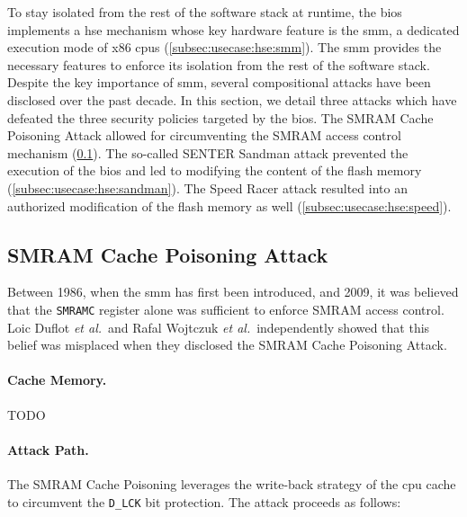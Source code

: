 To stay isolated from the rest of the software stack at runtime, the \ac{bios}
implements a \ac{hse} mechanism whose key hardware feature is the \ac{smm}, a
dedicated execution mode of x86 \acp{cpu} (\ref{subsec:usecase:hse:smm}).
%
The \ac{smm} provides the necessary features to enforce its isolation from the
rest of the software stack.
%
Despite the key importance of \ac{smm}, several compositional attacks have been
disclosed over the past decade.
%
In this section, we detail three attacks which have defeated the three security
policies targeted by the \ac{bios}.
%
The SMRAM Cache Poisoning Attack allowed for circumventing the SMRAM access
control mechanism (\ref{subsec:usecase:hse:smram}).
%
The so-called SENTER Sandman attack prevented the execution of the \ac{bios} and
led to modifying the content of the flash memory
(\ref{subsec:usecase:hse:sandman}).
%
The Speed Racer attack resulted into an authorized modification of the flash
memory as well (\ref{subsec:usecase:hse:speed}).

\subsection{SMRAM Cache Poisoning Attack} %
\label{subsec:usecase:hse:smram}

Between 1986, when the \ac{smm} has first been introduced, and 2009, it was
believed that the \texttt{SMRAMC} register alone was sufficient to enforce SMRAM
access control.
%
Loic Duflot \emph{et al.}\,\cite{duflot2009smram} and Rafal Wojtczuk \emph{et
  al.}\,\cite{wojtczuk2009smram} independently showed that this belief was
misplaced when they disclosed the SMRAM Cache Poisoning Attack.

\paragraph{Cache Memory.}
%
TODO

\paragraph{Attack Path.}
%
The SMRAM Cache Poisoning leverages the write-back strategy of the \ac{cpu}
cache to circumvent the \texttt{D\_LCK} bit protection.
%
The attack proceeds as follows:


